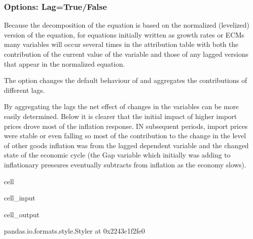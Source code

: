 \documentclass[letterpaper,10pt,english]{jupyterBook}
\begin{document}
\subsubsection{Options: Lag=True/False}
\label{\detokenize{content/06_ModelAnalytics/AttributionSomeFeatures:options-lag-true-false}}
\sphinxAtStartPar
Because the decomposition of the equation is based on the normalized (levelized) version of the equation, for equations initially written as growth rates or ECMs many variables will occur several times in the attribution table with both the contribution of the current value of the variable and those of any lagged versions that appear in the normalized equation.

\sphinxAtStartPar
The  option changes the default behaviour of  and aggregates the contributions of different lags.

\sphinxAtStartPar
By aggregating the lags the net effect of changes in the variables can be more easily determined. Below it is clearer that the initial impact of higher import prices drove most of the inflation response.  IN subsequent periods, import prices were stable or even falling so most of the contribution to the change in the level of other goods inflation was from the lagged dependent variable and the changed state of the economic cycle (the Gap variable which initially was adding to inflationary pressures eventually subtracts from inflation as the economy slows).

\begin{sphinxuseclass}{cell}\begin{sphinxVerbatimInput}

\begin{sphinxuseclass}{cell_input}
\begin{sphinxVerbatim}[commandchars=\\\{\}]
\end{sphinxVerbatim}

\end{sphinxuseclass}\end{sphinxVerbatimInput}
\begin{sphinxVerbatimOutput}

\begin{sphinxuseclass}{cell_output}
\begin{sphinxVerbatim}[commandchars=\\\{\}]
\PYGZlt{}pandas.io.formats.style.Styler at 0x2243c1f2fe0\PYGZgt{}
\end{sphinxVerbatim}

\end{sphinxuseclass}\end{sphinxVerbatimOutput}

\end{sphinxuseclass}
\end{document}
